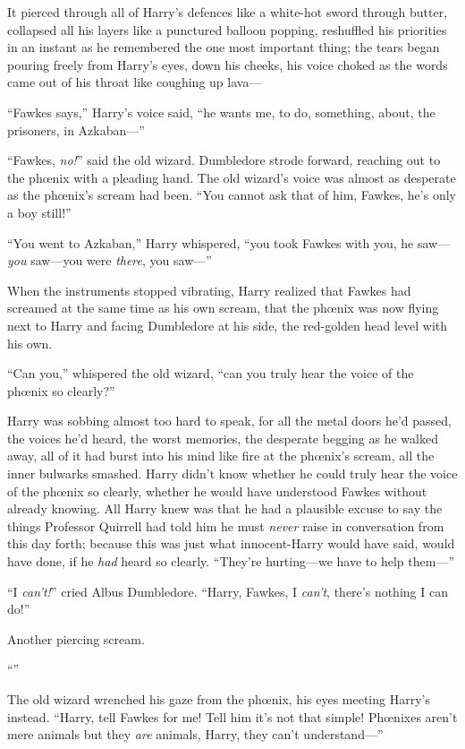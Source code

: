 It pierced through all of Harry’s defences like a white-hot sword through butter, collapsed all his layers like a punctured balloon popping, reshuffled his priorities in an instant as he remembered the one most important thing; the tears began pouring freely from Harry’s eyes, down his cheeks, his voice choked as the words came out of his throat like coughing up lava—

“Fawkes says,” Harry’s voice said, “he wants me, to do, something, about, the prisoners, in Azkaban—”

“Fawkes, \emph{no!}” said the old wizard. Dumbledore strode forward, reaching out to the phœnix with a pleading hand. The old wizard’s voice was almost as desperate as the phœnix’s scream had been. “You cannot ask that of him, Fawkes, he’s only a boy still!”

“You went to Azkaban,” Harry whispered, “you took Fawkes with you, he saw—\emph{you} saw—you were \emph{there}, you saw—”

When the instruments stopped vibrating, Harry realized that Fawkes had screamed at the same time as his own scream, that the phœnix was now flying next to Harry and facing Dumbledore at his side, the red-golden head level with his own.

“Can you,” whispered the old wizard, “can you truly hear the voice of the phœnix so clearly?”

Harry was sobbing almost too hard to speak, for all the metal doors he’d passed, the voices he’d heard, the worst memories, the desperate begging as he walked away, all of it had burst into his mind like fire at the phœnix’s scream, all the inner bulwarks smashed. Harry didn’t know whether he could truly hear the voice of the phœnix so clearly, whether he would have understood Fawkes without already knowing. All Harry knew was that he had a plausible excuse to say the things Professor Quirrell had told him he must \emph{never} raise in conversation from this day forth; because this was just what innocent-Harry would have said, would have done, if he \emph{had} heard so clearly. “They’re hurting—we have to help them—”

“I \emph{can’t!}” cried Albus Dumbledore. “Harry, Fawkes, I \emph{can’t}, there’s nothing I can do!”

Another piercing scream.

“”

The old wizard wrenched his gaze from the phœnix, his eyes meeting Harry’s instead. “Harry, tell Fawkes for me! Tell him it’s not that simple! Phœnixes aren’t mere animals but they \emph{are} animals, Harry, they can’t understand—”

